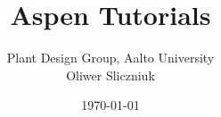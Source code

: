 \documentclass[a4paper,12pt]{book}
\begin{document}
\author{Plant Design Group, Aalto University\\ Oliwer Sliczniuk}
\title{Aspen Tutorials}
\date{\today}

\frontmatter
\maketitle
\tableofcontents

\mainmatter



\clearpage
\backmatter


\end{document}
